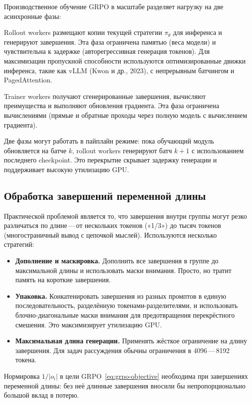 Производственное обучение GRPO в масштабе разделяет нагрузку на две асинхронные фазы:
\begin{description}[leftmargin=!,labelwidth=3.5cm]
  \item[Фаза генерации] Rollout workers размещают копии текущей стратегии $\pi_\theta$ для инференса и генерируют завершения. Эта фаза ограничена памятью (веса модели) и чувствительна к задержке (авторегрессивная генерация токенов). Для максимизации пропускной способности используются оптимизированные движки инференса, такие как vLLM (Kwon и др., 2023), с непрерывным батчингом и PagedAttention.
  \item[Фаза обучения] Trainer workers получают сгенерированные завершения, вычисляют преимущества и выполняют обновления градиента. Эта фаза ограничена вычислениями (прямые и обратные проходы через полную модель с вычислением градиента).
\end{description}
Две фазы могут работать в пайплайн режиме: пока обучающий модуль обновляется на батче $k$, rollout workers генерируют батч $k+1$ с использованием последнего checkpoint. Это перекрытие скрывает задержку генерации и поддерживает высокую утилизацию GPU.

\subsection{Обработка завершений переменной длины}

Практической проблемой является то, что завершения внутри группы могут резко различаться по длине\,---\,от нескольких токенов («1/3») до тысяч токенов (многостраничный вывод с цепочкой мыслей). Используются несколько стратегий:
\begin{itemize}[leftmargin=*]
  \item \textbf{Дополнение и маскировка.} Дополнить все завершения в группе до максимальной длины и использовать маски внимания. Просто, но тратит память на короткие завершения.
  \item \textbf{Упаковка.} Конкатенировать завершения из разных промптов в единую последовательность, разделённую токенами-разделителями, и использовать блочно-диагональные маски внимания для предотвращения перекрёстного смешения. Это максимизирует утилизацию GPU.
  \item \textbf{Максимальная длина генерации.} Применять жёсткое ограничение на длину завершения. Для задач рассуждения обычны ограничения в 4096\,---\,8192 токена.
\end{itemize}
Нормировка $1/|o_i|$ в цели GRPO~\eqref{eq:grpo-objective} необходима при завершениях переменной длины: без неё длинные завершения вносили бы непропорционально большой вклад в потерю.

